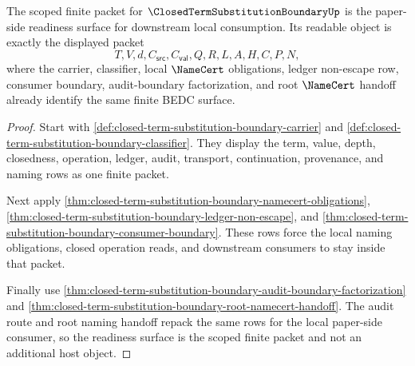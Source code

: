 \begin{theorem}
\label{thm:closed-term-substitution-boundary-finite-readiness-surface}
The scoped finite packet for $\ClosedTermSubstitutionBoundaryUp$ is the paper-side readiness surface for downstream local consumption. Its readable object is exactly the displayed packet
$$
T,V,d,C_{\mathsf{src}},C_{\mathsf{val}},Q,R,L,A,H,C,P,N,
$$
where the carrier, classifier, local $\NameCert$ obligations, ledger non-escape row, consumer boundary, audit-boundary factorization, and root $\NameCert$ handoff already identify the same finite BEDC surface.
\end{theorem}
\begin{proof}
Start with \autoref{def:closed-term-substitution-boundary-carrier} and \autoref{def:closed-term-substitution-boundary-classifier}. They display the term, value, depth, closedness, operation, ledger, audit, transport, continuation, provenance, and naming rows as one finite packet.

Next apply \autoref{thm:closed-term-substitution-boundary-namecert-obligations}, \autoref{thm:closed-term-substitution-boundary-ledger-non-escape}, and \autoref{thm:closed-term-substitution-boundary-consumer-boundary}. These rows force the local naming obligations, closed operation reads, and downstream consumers to stay inside that packet.

Finally use \autoref{thm:closed-term-substitution-boundary-audit-boundary-factorization} and \autoref{thm:closed-term-substitution-boundary-root-namecert-handoff}. The audit route and root naming handoff repack the same rows for the local paper-side consumer, so the readiness surface is the scoped finite packet and not an additional host object.
\end{proof}

